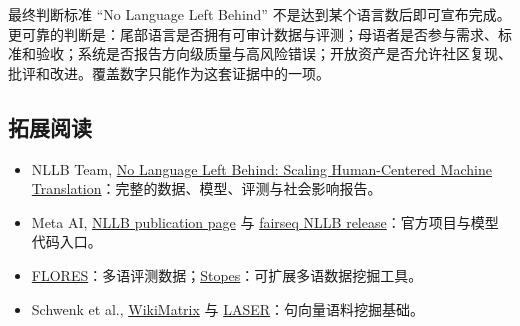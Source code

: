 \begin{importantbox}{最终判断标准}
“No Language Left Behind” 不是达到某个语言数后即可宣布完成。更可靠的判断是：尾部语言是否拥有可审计数据与评测；母语者是否参与需求、标准和验收；系统是否报告方向级质量与高风险错误；开放资产是否允许社区复现、批评和改进。覆盖数字只能作为这套证据中的一项。
\end{importantbox}

\subsection{拓展阅读}

\begingroup
\scriptsize
\begin{itemize}[itemsep=0pt,topsep=0.15em,parsep=0pt]
  \item NLLB Team, \href{https://arxiv.org/abs/2207.04672}{No Language Left Behind: Scaling Human-Centered Machine Translation}：完整的数据、模型、评测与社会影响报告。
  \item Meta AI, \href{https://research.facebook.com/publications/no-language-left-behind/}{NLLB publication page} 与 \href{https://github.com/facebookresearch/fairseq/tree/nllb}{fairseq NLLB release}：官方项目与模型代码入口。
  \item \href{https://github.com/facebookresearch/flores}{FLORES}：多语评测数据；\href{https://github.com/facebookresearch/stopes}{Stopes}：可扩展多语数据挖掘工具。
  \item Schwenk et al., \href{https://arxiv.org/abs/1907.05791}{WikiMatrix} 与 \href{https://github.com/facebookresearch/LASER}{LASER}：句向量语料挖掘基础。
\end{itemize}
\endgroup


